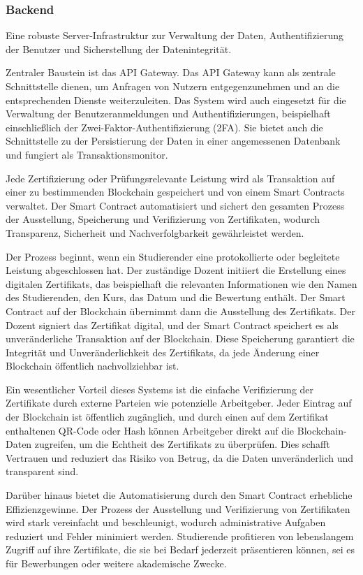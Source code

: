 \documentclass[conference]{IEEEtran}
\begin{document}
\subsubsection{Backend}
Eine robuste Server-Infrastruktur zur Verwaltung der Daten, Authentifizierung der Benutzer und Sicherstellung der Datenintegrität.

Zentraler Baustein ist das API Gateway. Das API Gateway kann als zentrale Schnittstelle dienen, um Anfragen von Nutzern entgegenzunehmen und an die entsprechenden Dienste weiterzuleiten. Das System wird auch eingesetzt für die Verwaltung der Benutzeranmeldungen und Authentifizierungen, beispielhaft einschließlich der Zwei-Faktor-Authentifizierung (2FA). Sie bietet auch die Schnittstelle zu der Persistierung der Daten in einer angemessenen Datenbank und fungiert als Transaktionsmonitor.

Jede Zertifizierung oder Prüfungsrelevante Leistung wird als Transaktion auf einer zu bestimmenden Blockchain gespeichert und von einem Smart Contracts verwaltet. Der Smart Contract automatisiert und sichert den gesamten Prozess der Ausstellung, Speicherung und Verifizierung von Zertifikaten, wodurch Transparenz, Sicherheit und Nachverfolgbarkeit gewährleistet werden.

Der Prozess beginnt, wenn ein Studierender eine protokollierte oder begleitete Leistung abgeschlossen hat. Der zuständige Dozent initiiert die Erstellung eines digitalen Zertifikats, das beispielhaft die relevanten Informationen wie den Namen des Studierenden, den Kurs, das Datum und die Bewertung enthält. Der Smart Contract auf der Blockchain übernimmt dann die Ausstellung des Zertifikats. Der Dozent signiert das Zertifikat digital, und der Smart Contract speichert es als unveränderliche Transaktion auf der Blockchain. Diese Speicherung garantiert die Integrität und Unveränderlichkeit des Zertifikats, da jede Änderung einer Blockchain öffentlich nachvollziehbar ist.

Ein wesentlicher Vorteil dieses Systems ist die einfache Verifizierung der Zertifikate durch externe Parteien wie potenzielle Arbeitgeber. Jeder Eintrag auf der Blockchain ist öffentlich zugänglich, und durch einen auf dem Zertifikat enthaltenen QR-Code oder Hash können Arbeitgeber direkt auf die Blockchain-Daten zugreifen, um die Echtheit des Zertifikats zu überprüfen. Dies schafft Vertrauen und reduziert das Risiko von Betrug, da die Daten unveränderlich und transparent sind.

Darüber hinaus bietet die Automatisierung durch den Smart Contract erhebliche Effizienzgewinne. Der Prozess der Ausstellung und Verifizierung von Zertifikaten wird stark vereinfacht und beschleunigt, wodurch administrative Aufgaben reduziert und Fehler minimiert werden. Studierende profitieren von lebenslangem Zugriff auf ihre Zertifikate, die sie bei Bedarf jederzeit präsentieren können, sei es für Bewerbungen oder weitere akademische Zwecke. 
\end{document}

